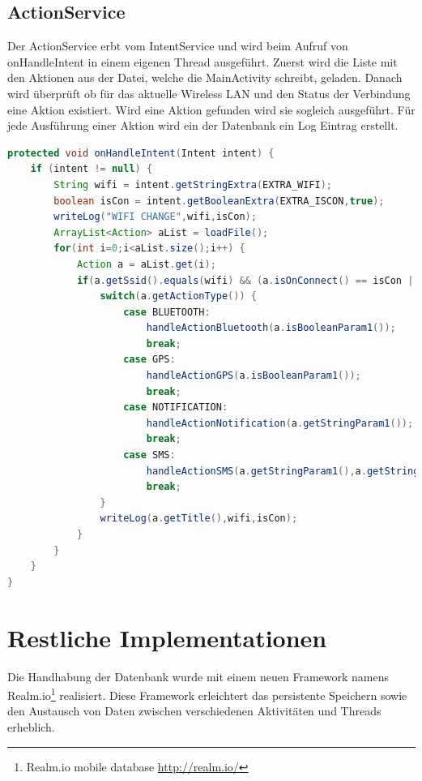 \subsection{ActionService}
Der ActionService erbt vom IntentService und wird beim Aufruf von onHandleIntent in einem eigenen Thread ausgeführt. Zuerst wird die Liste mit den Aktionen aus der Datei, welche die MainActivity schreibt, geladen. Danach wird überprüft ob für das aktuelle Wireless LAN und den Status der Verbindung eine Aktion existiert. Wird eine Aktion gefunden wird sie sogleich ausgeführt. Für jede Ausführung einer Aktion wird ein der Datenbank ein Log Eintrag erstellt.
\begin{lstlisting}[language=Java]
protected void onHandleIntent(Intent intent) {
    if (intent != null) {
        String wifi = intent.getStringExtra(EXTRA_WIFI);
        boolean isCon = intent.getBooleanExtra(EXTRA_ISCON,true);
        writeLog("WIFI CHANGE",wifi,isCon);
        ArrayList<Action> aList = loadFile();
        for(int i=0;i<aList.size();i++) {
            Action a = aList.get(i);
            if(a.getSsid().equals(wifi) && (a.isOnConnect() == isCon || a.isOnLeave() != isCon)) {
                switch(a.getActionType()) {
                    case BLUETOOTH:
                        handleActionBluetooth(a.isBooleanParam1());
                        break;
                    case GPS:
                        handleActionGPS(a.isBooleanParam1());
                        break;
                    case NOTIFICATION:
                        handleActionNotification(a.getStringParam1());
                        break;
                    case SMS:
                        handleActionSMS(a.getStringParam1(),a.getStringParam2());
                        break;
                }
                writeLog(a.getTitle(),wifi,isCon);
            }
        }
    }
}
\end{lstlisting}

\section{Restliche Implementationen}
Die Handhabung der Datenbank wurde mit einem neuen Framework namens Realm.io\footnote{Realm.io mobile database \url{http://realm.io/}} realisiert. Diese Framework erleichtert das persistente Speichern sowie den Austausch von Daten zwischen verschiedenen Aktivitäten und Threads erheblich.